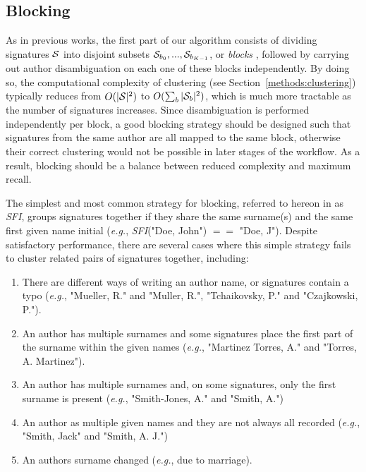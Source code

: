 \documentclass{article}
\newcommand{\eg}{\emph{e.g.}\xspace}
\begin{document}
\subsection{Blocking}
\label{methods:blocking}

As in previous works, the first part of our algorithm consists of dividing
signatures ${\cal S}$ into disjoint subsets ${\cal S}_{b_0}, ..., {\cal
S}_{b_{K-1}}$, or \textit{blocks} \citep{fellegi69}, followed by carrying out
author disambiguation on each one of these blocks independently.
By doing so, the computational complexity of clustering (see Section~\ref{methods:clustering})
typically reduces from $O(|{\cal S}|^2)$ to $O(\sum_b |{\cal S}_b|^2)$, which is much more
tractable as the number of signatures increases.
Since disambiguation is performed independently per block, a good blocking strategy should be
designed such that signatures from the same author are all mapped to the same
block, otherwise their correct clustering would not be possible in later stages of the workflow.
As a result, blocking should be a balance between reduced complexity and maximum recall.

The simplest and most common strategy for blocking, referred to hereon in as \emph{SFI},
groups signatures together if they share the same surname(s) and the same first
given name initial (\eg, \emph{SFI}("Doe, John") $==$ "Doe, J").
Despite satisfactory performance, there are several cases where this simple strategy fails to cluster related pairs of signatures together, including:

\begin{enumerate}
  \item There are different
  ways of writing an author name, or signatures contain a typo
  (\eg, "Mueller, R." and "Muller, R.", "Tchaikovsky, P." and "Czajkowski, P.").

  \item An author has multiple surnames and some signatures place the first part of the surname within the given names (\eg, "Martinez Torres, A." and "Torres, A. Martinez").

  \item An author has multiple surnames and, on some signatures, only the first surname is
  present (\eg, "Smith-Jones, A." and "Smith, A.")

  \item An author as multiple given names and they are not always all recorded (\eg,
  "Smith, Jack" and "Smith, A. J.")

  \item An authors surname changed (\eg, due to marriage).
\end{enumerate}
\end{document}
